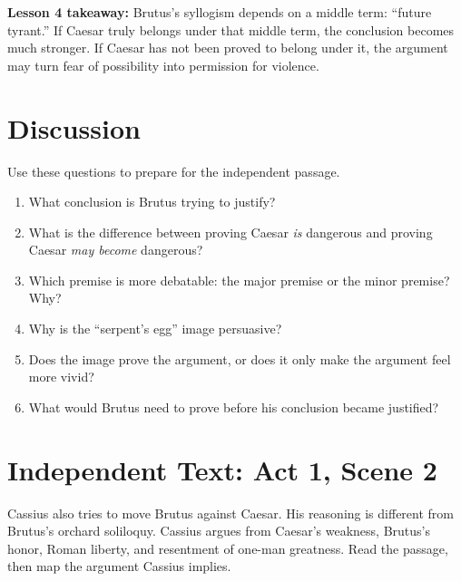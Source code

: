\documentclass[12pt]{article}
\newcommand{\focusbox}[1]{\par\vspace{0.35em}\noindent\begingroup\setlength{\fboxsep}{6pt}\colorbox{gray!12}{\begin{minipage}{\dimexpr\linewidth-2\fboxsep\relax}#1\end{minipage}}\endgroup\par\vspace{0.45em}}
\begin{document}
\focusbox{\textbf{Lesson 4 takeaway:} Brutus's syllogism depends on a middle term: ``future tyrant.'' If Caesar truly belongs under that middle term, the conclusion becomes much stronger. If Caesar has not been proved to belong under it, the argument may turn fear of possibility into permission for violence.}

\section*{Discussion}
Use these questions to prepare for the independent passage.

\begin{enumerate}[leftmargin=*]
\item What conclusion is Brutus trying to justify?
\item What is the difference between proving Caesar \textit{is} dangerous and proving Caesar \textit{may become} dangerous?
\item Which premise is more debatable: the major premise or the minor premise? Why?
\item Why is the ``serpent's egg'' image persuasive?
\item Does the image prove the argument, or does it only make the argument feel more vivid?
\item What would Brutus need to prove before his conclusion became justified?
\end{enumerate}

\section*{Independent Text: Act 1, Scene 2}
Cassius also tries to move Brutus against Caesar. His reasoning is different from Brutus's orchard soliloquy. Cassius argues from Caesar's weakness, Brutus's honor, Roman liberty, and resentment of one-man greatness. Read the passage, then map the argument Cassius implies.
\end{document}
